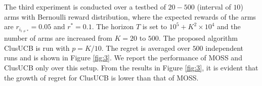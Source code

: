 	The third experiment is conducted over a testbed of $20-500$ (interval of $10$) arms with Bernoulli reward distribution, where the expected rewards of the arms are $r_{i_{{i}\neq {*}}}=0.05$ and $r^{*}=0.1$. The horizon $T$ is set to $10^{5} + K^{2}\times 10^{4}$ and the number of arms are increased from $K=20$ to $500$. The proposed algorithm ClusUCB is run with $p=K/10$. The regret is averaged over $500$ independent runs and is shown in Figure \ref{fig:3}. We report the performance of MOSS and ClusUCB only over this setup. From the results in Figure \ref{fig:3}, it is evident that the growth of regret for ClusUCB is lower than that of MOSS. 

